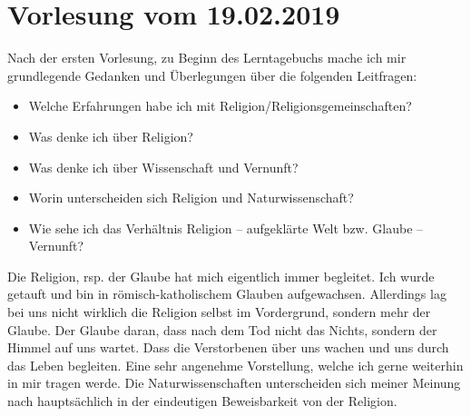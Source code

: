 \section{Vorlesung vom 19.02.2019}
Nach der ersten Vorlesung, zu Beginn des Lerntagebuchs mache ich mir grundlegende Gedanken und Überlegungen über die folgenden Leitfragen:\\
\begin{itemize}
\item Welche Erfahrungen habe ich mit Religion/Religionsgemeinschaften?\\
\item Was denke ich über Religion?\\
\item Was denke ich über Wissenschaft und Vernunft?\\
\item Worin unterscheiden sich Religion und Naturwissenschaft?\\
\item Wie sehe ich das Verhältnis Religion – aufgeklärte Welt bzw. Glaube – Vernunft?
\end{itemize}

\hrulefill

Die Religion, rsp. der Glaube hat mich eigentlich immer begleitet. Ich wurde getauft und bin in römisch-katholischem Glauben aufgewachsen. Allerdings lag bei uns nicht wirklich die Religion selbst im Vordergrund, sondern mehr der Glaube. Der Glaube daran, dass nach dem Tod nicht das Nichts, sondern der Himmel auf uns wartet. Dass die Verstorbenen über uns wachen und uns durch das Leben begleiten. Eine sehr angenehme Vorstellung, welche ich gerne weiterhin in mir tragen werde. Die Naturwissenschaften unterscheiden sich meiner Meinung nach hauptsächlich in der eindeutigen Beweisbarkeit von der Religion. \\


